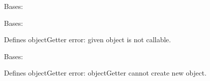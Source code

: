 \documentclass[letterpaper,10pt,english]{sphinxmanual}
\begin{document}

\begin{fulllineitems}
\label{RRtoolbox.lib:RRtoolbox.lib.root.NoParserFound}
Bases: 

\end{fulllineitems}


\begin{fulllineitems}
\label{RRtoolbox.lib:RRtoolbox.lib.root.NotCallable}
Bases: 

Defines objectGetter error: given object is not callable.

\end{fulllineitems}


\begin{fulllineitems}
\label{RRtoolbox.lib:RRtoolbox.lib.root.NotCreatable}
Bases: 

Defines objectGetter error: objectGetter cannot create new object.

\end{fulllineitems}

\end{document}

